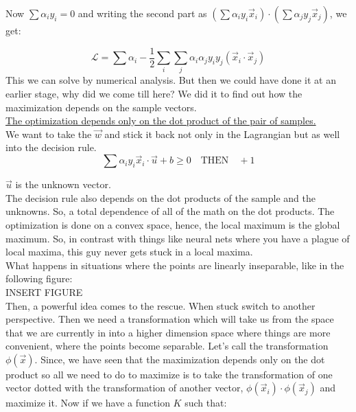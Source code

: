 \documentclass[12pt,a4paper]{report}
\begin{document}
Now $\sum \alpha_i y_i = 0$ and writing the second part as $(\sum \alpha_i y_i \vec{x}_i) \cdot (\sum \alpha_j y_j \vec{x}_j)$, we get:

\begin{equation}
\boxed{
\mathcal{L} = \sum \alpha_i - \frac{1}{2} \sum_i \sum_j \alpha_i \alpha_j y_i  y_j \boxed{ ( \vec{x}_i \cdot  \vec{x}_j ) }
}
\end{equation}
This we can solve by numerical analysis. But then we could have done it at an earlier stage, why did we come till here? We did it to find out how the maximization depends on the sample vectors. \\
\underline{
The optimization depends only on the dot product of the pair of samples.}\\
We want to take the $\vec{w}$ and stick it back not only in the Lagrangian but as well into the decision rule.\\
\begin{equation}
\sum \alpha_i y_i \boxed{ \vec{x}_i \cdot \vec{u} }+ b \geq 0 \quad  \text{THEN} \quad + 1
\end{equation}

$\vec{u}$ is the unknown vector. \\
The decision rule also depends on the dot products of the sample and the unknowns. So, a total dependence of all of the math on the dot products. The optimization is done on a convex space, hence, the local maximum is the global maximum. So, in contrast with things like neural nets where you have a plague of local maxima, this guy never gets stuck in a local maxima. \\

What happens in situations where the points are linearly inseparable, like in the following figure:\\
INSERT FIGURE\\
Then, a powerful idea comes to the rescue. When stuck switch to another perspective. Then we need a transformation which will take us from the space that we are currently in into a higher dimension space where things are more convenient, where the points become separable. Let's call the transformation $\phi(\vec{x})$. Since, we have seen that the maximization depends only on the dot product so all we need to do to maximize is to  take the transformation of one vector dotted with the transformation of another vector, $\phi(\vec{x}_i) \cdot \phi(\vec{x}_j)$ and maximize it. Now if we have a function $K$ such that:\\
\end{document}
